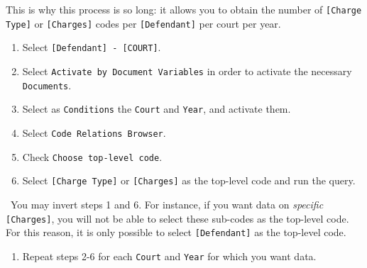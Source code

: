 \documentclass[usenames,dvipsnames]{article}
\newcommand{\code}[1]{\colorbox{light-gray}{\texttt{#1}}}
\newcommand{\command}[1]{\colorbox{light-red}{\texttt{#1}}}
\newcommand{\option}[1]{\colorbox{light-blue}{\texttt{#1}}}
\newcommand{\chargingdocs}[1]{\colorbox{light-yellow}{\texttt{#1}}}
\newcommand{\variable}[1]{\colorbox{light-green}{\texttt{#1}}}
\newcommand{\note}[1]{\textit{\textbf{Note:} }}
\begin{document}
This is why this process is so long: it allows you to obtain the number of \code{[Charge Type]} or \code{[Charges]} codes per \code{[Defendant]} per court per year.
\begin{enumerate}
	\item Select \code{[Defendant] - [COURT]}.
	\item Select \command{Activate by Document Variables} in order to activate the necessary \chargingdocs{Documents}.
	\item Select as \option{Conditions} the \variable{Court} and \variable{Year}, and activate them.
	\item Select \command{Code Relations Browser}.
	\item Check \option{Choose top-level code}.
	\item Select \code{[Charge Type]} or \code{[Charges]} as the top-level code and run the query.
\end{enumerate}
\note ~You may invert steps 1 and 6. For instance, if you want data on \textit{specific} \code{[Charges]}, you will not be able to select these sub-codes as the top-level code. For this reason, it is only possible to select \code{[Defendant]} as the top-level code. 
\begin{enumerate}[resume]
	\item Repeat steps 2-6 for each \variable{Court} and \variable{Year} for which you want data.
\end{enumerate}
	
\end{document}
